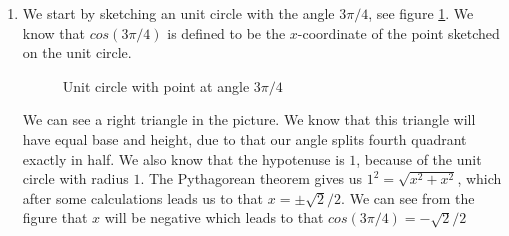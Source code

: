 \begin{enumerate}[label=(\alph*)]
  \item
    We start by sketching an unit circle with the angle $ 3\pi/4 $, see figure \ref{figure:checkpoint-1.1.18-a-1}. We know that $ cos(3\pi/4) $ is defined to be the $ x $-coordinate of the point sketched on the unit circle.

    \begin{figure}
      \centering
      \caption{Unit circle with point at angle $ 3\pi/4 $}
      \label{figure:checkpoint-1.1.18-a-1}
    \end{figure}

    We can see a right triangle in the picture. We know that this triangle will have equal base and height, due to that our angle splits fourth quadrant exactly in half. We also know that the hypotenuse is $ 1 $, because of the unit circle with radius $ 1 $. The Pythagorean theorem gives us $ 1^2 = \sqrt{x^2 + x^2} $, which after some calculations leads us to that $ x = \pm\sqrt{2}/2 $. We can see from the figure that $ x $ will be negative which leads to that $ cos(3\pi/4) = -\sqrt{2}/2 $

    \begin{figure}
      \centering
\end{figure}
\end{enumerate}
